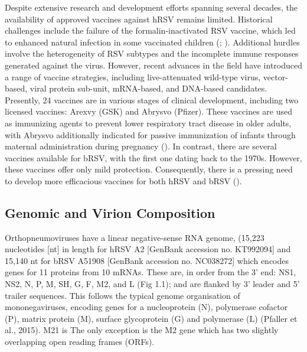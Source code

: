 Despite extensive research and development efforts spanning several decades, the availability of approved vaccines against hRSV remains limited. Historical challenges include the failure of the formalin-inactivated RSV vaccine, which led to enhanced natural infection in some vaccinated children (\cite{Fulginiti1969RespiratoryVaccine.}; \cite{Kim1969RespiratoryVaccine.}). Additional hurdles involve the heterogeneity of RSV subtypes and the incomplete immune responses generated against the virus. However, recent advances in the field have introduced a range of vaccine strategies, including live-attenuated wild-type virus, vector-based, viral protein sub-unit, mRNA-based, and DNA-based candidates. Presently, 24 vaccines are in various stages of clinical development, including two licensed vaccines: Arexvy (GSK) and Abrysvo (Pfizer). These vaccines are used as immunizing agents to prevent lower respiratory tract disease in older adults, with Abrysvo additionally indicated for passive immunization of infants through maternal administration during pregnancy (\cite{Topalidou2023RespiratoryVaccines}). In contrast, there are several vaccines available for bRSV, with the first one dating back to the 1970s. However, these vaccines offer only mild protection. Consequently, there is a pressing need to develop more efficacious vaccines for both hRSV and bRSV (\cite{Ellis2017HowCattle}).

\subsection{Genomic and Virion Composition} \label{subsec:Genomic and Virion Composition}
Orthopneumoviruses have a linear negative-sense RNA genome, (15,223 nucleotides [nt] in length for hRSV A2 [GenBank accession no. KT992094] and 15,140 nt for bRSV A51908 [GenBank accession no. NC038272] which encodes genes for 11 proteins from 10 mRNAs. These are, in order from the 3' end: NS1, NS2, N, P, M, SH, G, F, M2, and L (Fig 1.1); and are flanked by 3' leader and 5' trailer sequences. This follows the typical genome organisation of mononegaviruses, encoding genes for a nucleoprotein (N), polymerase cofactor (P), matrix protein (M), surface glycoprotein (G) and polymerase (L) (Pfaller et al., 2015). M21 is The only exception is the M2 gene which has two slightly overlapping open reading frames (ORFs). 


